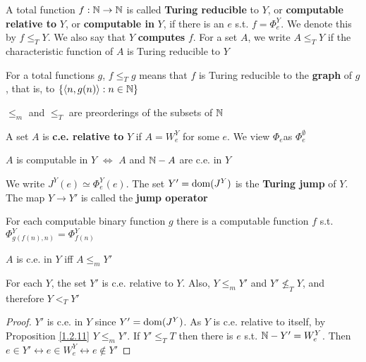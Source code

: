 \documentclass[11pt]{article}
\begin{document}
\begin{definition}[]
A total function \(f:\mathbb{N}\to\mathbb{N}\) is called \textbf{Turing reducible} to \(Y\), or \textbf{computable relative to} \(Y\),
or \textbf{computable in} \(Y\), if there is an \(e\) s.t. \(f=\Phi_e^Y\). We denote this by \(f\le_TY\). We
also say that \(Y\) \textbf{computes} \(f\). For a set \(A\), we write \(A\le_TY\) if the characteristic
function of \(A\) is Turing reducible to \(Y\)
\end{definition}

For a total functions \(g\), \(f\le_Tg\) means that \(f\) is Turing reducible to the \textbf{graph}
of \(g\), that is, to \(\{\langle n,g(n)\rangle:n\in\mathbb{N}\}\)

\begin{exercise}
\label{1.2.7}
\(\le_m\) and \(\le_T\) are preorderings of the subsets of \(\mathbb{N}\)
\end{exercise}

A set \(A\) is \textbf{c.e. relative to} \(Y\) if \(A=W_e^Y\) for some \(e\). We view \(\Phi_e\)as \(\Phi_e^{\emptyset}\)

\begin{proposition}[]
\label{1.2.8}
\(A\) is computable in \(Y\) \(\Leftrightarrow\) \(A\) and \(\mathbb{N}-A\) are c.e. in \(Y\)
\end{proposition}

\begin{definition}[]
We write \(J^Y(e)\simeq\Phi_e^Y(e)\). The set \(Y'=\operatorname{dom}(J^Y)\) is the \textbf{Turing jump} of \(Y\). The
map \(Y\to Y'\) is called the \textbf{jump operator}
\end{definition}

\begin{theorem}[]
For each computable binary function \(g\) there is a computable function \(f\) s.t. \(\Phi_{g(f(n),n)}^Y=\Phi_{f(n)}^Y\)
\end{theorem}

\begin{proposition}[]
\label{1.2.11}
\(A\) is c.e. in \(Y\) iff \(A\le_mY'\)
\end{proposition}

\begin{proposition}[]
\label{1.2.12}
For each \(Y\), the set \(Y'\) is c.e. relative to \(Y\). Also, \(Y\le_mY'\) and \(Y'\not\le_TY\),
and therefore \(Y<_TY'\)
\end{proposition}

\begin{proof}
\(Y'\) is c.e. in \(Y\) since \(Y'=\operatorname{dom}(J^Y)\). As \(Y\) is c.e. relative to itself, by
Proposition \ref{1.2.11} \(Y\le_mY'\). If \(Y'\le_TT\) then there is \(e\) s.t. \(\mathbb{N}-Y'=W_e^Y\).
Then \(e\in Y'\leftrightarrow e\in W_e^Y\leftrightarrow e\notin Y'\)
\end{proof}
\end{document}
